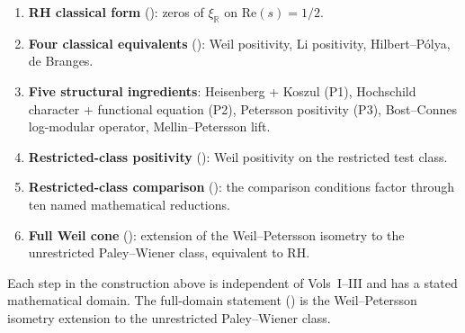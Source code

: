 \begin{enumerate}
\item \textbf{RH classical form}
(): zeros of \(\xi_{\mathbb{R}}\) on
\(\mathrm{Re}(s)=1/2\).
\item \textbf{Four classical equivalents}
(): Weil positivity,
Li positivity, Hilbert--P\'olya, de Branges.
\item \textbf{Five structural ingredients}:
Heisenberg + Koszul (P1), Hochschild character + functional equation
(P2), Petersson positivity (P3), Bost--Connes log-modular operator,
Mellin--Petersson lift.
\item \textbf{Restricted-class positivity}
(): Weil positivity on the
restricted test class.
\item \textbf{Restricted-class comparison}
(): the comparison
conditions factor through ten named mathematical reductions.
\item \textbf{Full Weil cone}
(): extension of
the Weil--Petersson isometry to the unrestricted Paley--Wiener
class, equivalent to RH.
\end{enumerate}

Each step in the construction above is independent of Vols~I--III
and has a stated mathematical domain. The full-domain statement
() is the Weil--Petersson
isometry extension to the unrestricted Paley--Wiener class.
